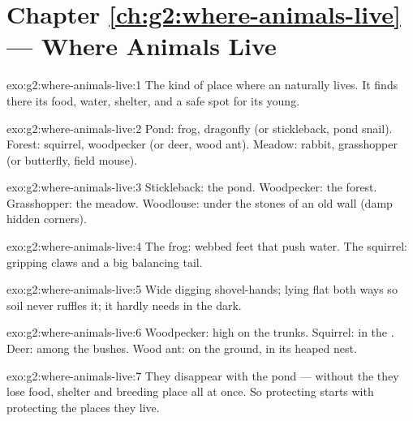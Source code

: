 \section*{Chapter \ref{ch:g2:where-animals-live} --- Where Animals Live}

\begin{solution}{exo:g2:where-animals-live:1}
The kind of place where an  naturally lives. It finds there
its food, water, shelter, and a safe spot for its young.
\end{solution}

\begin{solution}{exo:g2:where-animals-live:2}
Pond: frog, dragonfly (or stickleback, pond snail). Forest:
squirrel, woodpecker (or deer, wood ant). Meadow: rabbit,
grasshopper (or butterfly, field mouse).
\end{solution}

\begin{solution}{exo:g2:where-animals-live:3}
Stickleback: the pond. Woodpecker: the forest. Grasshopper: the
meadow. Woodlouse: under the stones of an old wall (damp hidden
corners).
\end{solution}

\begin{solution}{exo:g2:where-animals-live:4}
The frog: webbed feet that push water. The squirrel: gripping
claws and a big balancing tail.
\end{solution}

\begin{solution}{exo:g2:where-animals-live:5}
Wide digging shovel-hands;  lying flat both ways so soil never
ruffles it;  it hardly needs in the dark.
\end{solution}

\begin{solution}{exo:g2:where-animals-live:6}
Woodpecker: high on the trunks. Squirrel: in the . Deer:
among the bushes. Wood ant: on the ground, in its heaped nest.
\end{solution}

\begin{solution}{exo:g2:where-animals-live:7}
They disappear with the pond --- without the  they lose
food, shelter and breeding place all at once. So protecting
 starts with protecting the places they live.
\end{solution}

